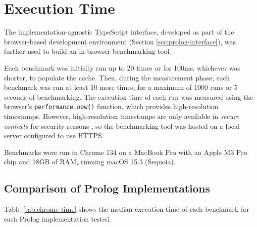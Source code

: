 \section{Execution Time}

\label{sec:execution-time}

The implementation-agnostic TypeScript interface, developed as part of the browser-based development environment (Section \ref{sec:prolog-interface}), was further used to build an in-browser benchmarking tool.

Each benchmark was initially run up to 20 times or for 100ms, whichever was shorter, to populate the cache. Then, during the measurement phase, each benchmark was run at least 10 more times, for a maximum of 1000 runs or 5 seconds of benchmarking. The execution time of each run was measured using the browser's \texttt{performance.now()} function, which provides high-resolution timestamps. However, high-resolution timestamps are only available in \emph{secure contexts} for security reasons \cite{sanchez-rolaClockClockTimeBased2018}, so the benchmarking tool was hosted on a local server configured to use HTTPS.

Benchmarks were run in Chrome 134 on a MacBook Pro with an Apple M3 Pro chip and 18GB of RAM, running macOS 15.3 (Sequoia).

\subsection{Comparison of Prolog Implementations}

\label{sec:prolog-comparison}

Table \ref{tab:chrome-time} shows the median execution time of each benchmark for each Prolog implementation tested.

